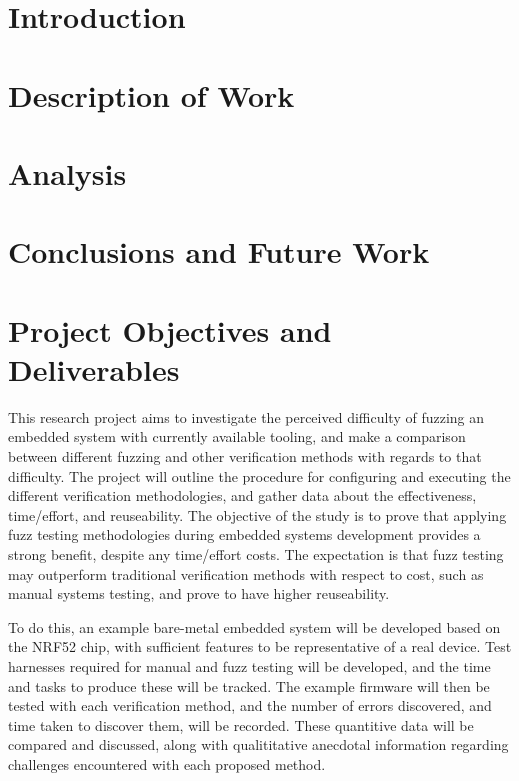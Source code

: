 \documentclass[11pt]{article}
\begin{document}

\section{Introduction}



\section{Description of Work} \label{sec:1}

\section{Analysis}

\section{Conclusions and Future Work}





\section{Project Objectives and Deliverables} \label{sec:2}
This research project aims to investigate the perceived difficulty of fuzzing
an embedded system with currently available tooling, and make a comparison
between different fuzzing and other verification methods with regards to that
difficulty. The project will outline the procedure for configuring and
executing the different verification methodologies, and gather data about the
effectiveness, time/effort, and reuseability. The objective of the study is to
prove that applying fuzz testing methodologies during embedded systems
development provides a strong benefit, despite any time/effort costs. The
expectation is that fuzz testing may outperform traditional verification
methods with respect to cost, such as manual systems testing, and prove to have
higher reuseability.

To do this, an example bare-metal embedded system will be developed based on
the NRF52 chip, with sufficient features to be representative of a real device.
Test harnesses required for manual and fuzz testing will be developed, and the
time and tasks to produce these will be tracked. The example firmware will then
be tested with each verification method, and the number of errors discovered,
and time taken to discover them, will be recorded. These quantitive data will
be compared and discussed, along with qualititative anecdotal information
regarding challenges encountered with each proposed method.
\end{document}

